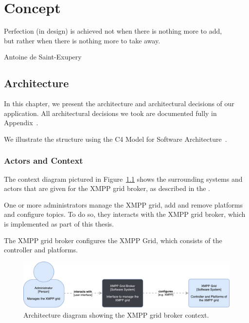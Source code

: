 \chapter{Concept} %
\epigraph{Perfection (in design) is achieved not when there is nothing more to add,\\but rather when there is nothing more to take away.}{Antoine de Saint-Exupery}


\section{Architecture}

In this chapter, we present the architecture and architectural decisions of our application. All architectural decisions we took are documented fully in Appendix~.

We illustrate the structure using the C4 Model for Software Architecture~\cite{c4-model}.

\subsection{Actors and Context}

The context diagram pictured in Figure~\ref{fig:architecturecontext} shows the surrounding systems and actors that are given for the XMPP grid broker, as described in the .

One or more administrators manage the XMPP grid, add and remove \glspl{platform} and configure \glspl{topic}.
To do so, they interacts with the XMPP grid broker, which is implemented as part of this thesis.

The XMPP grid broker configures the XMPP Grid, which consists of the \gls{controller} and \glspl{platform}.

\begin{figure}[h]
\centering
\includegraphics[width=\linewidth]{resources/architecture_context}
\caption[Architecture Context Diagram]{Architecture diagram showing the XMPP grid broker context.}
\label{fig:architecturecontext}
\end{figure}


